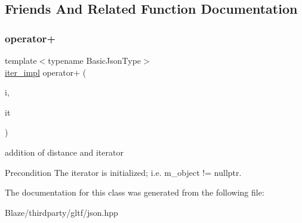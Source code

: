 \subsection{Friends And Related Function Documentation}
\mbox{\label{classnlohmann_1_1detail_1_1iter__impl_a94108d1a7563e103534f23eb5c1ee175}} 
\subsubsection{\texorpdfstring{operator+}{operator+}}
{\footnotesize\ttfamily template$<$typename Basic\+Json\+Type$>$ \\
\hyperlink{classnlohmann_1_1detail_1_1iter__impl}{iter\+\_\+impl} operator+ (\begin{DoxyParamCaption}\item[{\hyperlink{classnlohmann_1_1detail_1_1iter__impl_a2f7ea9f7022850809c60fc3263775840}{difference\+\_\+type}}]{i,  }\item[{const \hyperlink{classnlohmann_1_1detail_1_1iter__impl}{iter\+\_\+impl}$<$ Basic\+Json\+Type $>$ \&}]{it }\end{DoxyParamCaption})\hspace{0.3cm}{\ttfamily [friend]}}



addition of distance and iterator 

\begin{DoxyPrecond}{Precondition}
The iterator is initialized; i.\+e. {\ttfamily m\+\_\+object != nullptr}. 
\end{DoxyPrecond}


The documentation for this class was generated from the following file\+:\begin{DoxyCompactItemize}
\item 
Blaze/thirdparty/gltf/json.\+hpp\end{DoxyCompactItemize}
